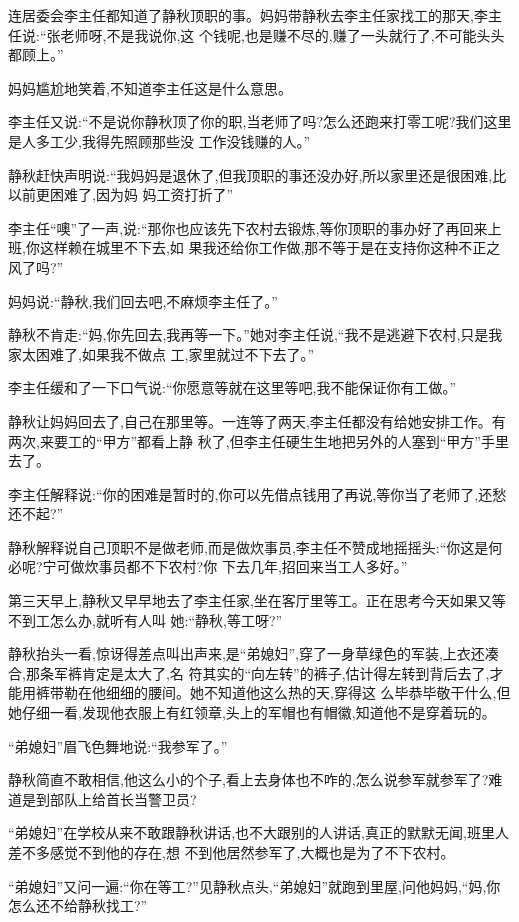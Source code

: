 ﻿\documentclass[12pt]{article}
\begin{document}
连居委会李主任都知道了静秋顶职的事。妈妈带静秋去李主任家找工的那天,李主任说:``张老师呀,不是我说你,这
个钱呢,也是赚不尽的,赚了一头就行了,不可能头头都顾上。''

妈妈尴尬地笑着,不知道李主任这是什么意思。

李主任又说:``不是说你静秋顶了你的职,当老师了吗?怎么还跑来打零工呢?我们这里是人多工少,我得先照顾那些没
工作没钱赚的人。''

静秋赶快声明说:``我妈妈是退休了,但我顶职的事还没办好,所以\myrule 家里还是很困难,比以前更困难了,因为妈
妈工资打折了\myrule ''

李主任``噢''了一声,说:``那你也应该先下农村去锻炼,等你顶职的事办好了再回来上班,你这样赖在城里不下去,如
果我还给你工作做,那不等于是在支持你这种不正之风了吗?''

妈妈说:``静秋,我们回去吧,不麻烦李主任了。''

静秋不肯走:``妈,你先回去,我再等一下。''她对李主任说,``我不是逃避下农村,只是我家太困难了,如果我不做点
工,家里就过不下去了。''

李主任缓和了一下口气说:``你愿意等就在这里等吧,我不能保证你有工做。''

静秋让妈妈回去了,自己在那里等。一连等了两天,李主任都没有给她安排工作。有两次,来要工的``甲方''都看上静
秋了,但李主任硬生生地把另外的人塞到``甲方''手里去了。

李主任解释说:``你的困难是暂时的,你可以先借点钱用了再说,等你当了老师了,还愁还不起?''

静秋解释说自己顶职不是做老师,而是做炊事员,李主任不赞成地摇摇头:``你这是何必呢?宁可做炊事员都不下农村?你
下去几年,招回来当工人多好。''

第三天早上,静秋又早早地去了李主任家,坐在客厅里等工。正在思考今天如果又等不到工怎么办,就听有人叫
她:``静秋,等工呀?''

静秋抬头一看,惊讶得差点叫出声来,是``弟媳妇'',穿了一身草绿色的军装,上衣还凑合,那条军裤肯定是太大了,名
符其实的``向左转''的裤子,估计得左转到背后去了,才能用裤带勒在他细细的腰间。她不知道他这么热的天,穿得这
么毕恭毕敬干什么,但她仔细一看,发现他衣服上有红领章,头上的军帽也有帽徽,知道他不是穿着玩的。

``弟媳妇''眉飞色舞地说:``我参军了。''

静秋简直不敢相信,他这么小的个子,看上去身体也不咋的,怎么说参军就参军了?难道是到部队上给首长当警卫员?

``弟媳妇''在学校从来不敢跟静秋讲话,也不大跟别的人讲话,真正的默默无闻,班里人差不多感觉不到他的存在,想
不到他居然参军了,大概也是为了不下农村。

``弟媳妇''又问一遍:``你在等工?''见静秋点头,``弟媳妇''就跑到里屋,问他妈妈,``妈,你怎么还不给静秋找工?''
\end{document}
